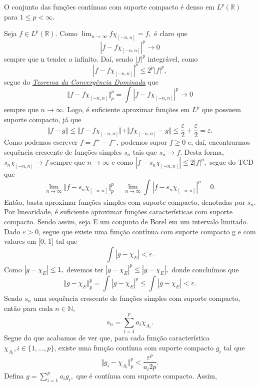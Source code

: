 \documentclass[MeasureTheory/measure_theory.tex]{subfiles}
\begin{document}
\begin{prop*}
	O conjunto das funções contínuas com suporte compacto é denso em \(L^{p}(\mathbb{R})\) para \(1\leq p < \infty\).
\end{prop*}
\begin{proof*}
	Seja \(f\in L^{p}(\mathbb{R})\). Como \(\lim_{n\to \infty}f \chi_{[-n, n]} = f,\) é claro que
	\[
		|f-f\chi_{[-n, n]}|^{p}\to 0
	\]
	sempre que n tender a infinito. Daí, sendo \(|f|^{p}\) integrável, como
	\[
		|f-f\chi_{[-n, n]}|^{p}\leq 2^{p}|f|^{p},
	\]
	segue do \hyperlink{dominated_convergence}{\textit{Teorema da Convergência Dominada}} que
	\[
		\Vert f - f\chi_{[-n, n]} \Vert_{p}^{p} = \int_{}^{}|f-f\chi_{[-n, n]}|^{p}\to 0
	\]
	sempre que \(n\to \infty\). Logo, é suficiente aproximar funções em \(L^{p}\) que possuem suporte compacto, já que
	\[
		\Vert f -g  \Vert \leq \Vert f - f\chi_{[-n, n]} \Vert + \Vert f\chi_{[-n, n]} - g \Vert \leq \frac{\varepsilon }{2} + \frac{\varepsilon }{2} = \varepsilon.
	\]
	Como podemos escrever \(f=f^{+}-f^{-}\), podemos supor \(f\geq 0\) e, daí, encontrarmos sequência crescente de funções simples \(s_{n}\)
	tais que \(s_{n}\to f\). Desta forma, \(s_{n}\chi_{[-n, n]}\to f\) sempre que \(n\to \infty\) e como \(|f-s_{n}\chi_{[-n, n]}|\leq 2|f|^{p},\) segue do TCD que
	\[
		\lim_{n\to \infty}\Vert f - s_{n}\chi_{[-n, n]} \Vert_{p}^{p} = \lim_{n\to \infty}\int_{}^{}|f-s_{n}\chi_{[-n, n]}|^{p} = 0.
	\]
	Então, basta aproximar funções simples com suporte compacto, denotadas por \(s_{n}\). Por linearidade, é suficiente aproximar funções características com suporte compacto. Sendo assim, seja E um conjunto de Borel em um intervalo limitado. Dado \(\varepsilon  > 0\), segue que existe uma função contínua com suporte compacto g e com valores em [0, 1] tal que
	\[
		\int_{}^{}|g-\chi_{E}|<\varepsilon .
	\]
	Como \(|g-\chi_{E}|\leq 1,\) devemos ter \(|g-\chi_{E}|^{p}\leq |g-\chi_{E}|,\) donde concluímos que
	\[
		\Vert g-\chi_{E} \Vert_{p}^{p} = \int_{}^{}|g-\chi_{E}|^{p} \leq \int_{}^{}|g-\chi_{E}| < \varepsilon .
	\]
	Sendo \(s_{n}\) uma sequência crescente de funções simples com suporte compacto, então para cada \(n\in \mathbb{N},\)
	\[
		s_{n} = \sum\limits_{i=1}^{p}a_{i}\chi_{A_{i}}.
	\]
	Segue do que acabamos de ver que, para cada função característica \(\chi_{A_{i}}, i\in \{1, \dotsc , p\}\), existe uma função contínua com suporte compacto \(g_{i}\) tal que
	\[
		\Vert g_{i}-\chi_{A_{i}} \Vert_{p}^{p}<\frac{\varepsilon ^{p}}{a_{i}2p}.
	\]
	Defina \(g = \sum\limits_{i=1}^{p}a_{i}g_{i},\) que é contínua com suporte compacto. Assim,
	\begin{align*}

\end{align*}
\end{proof*}
\end{document}
